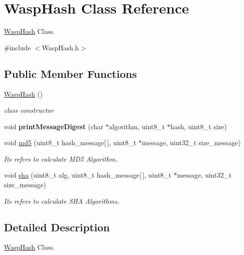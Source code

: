 \hypertarget{class_wasp_hash}{}\section{Wasp\+Hash Class Reference}
\label{class_wasp_hash}


\hyperlink{class_wasp_hash}{Wasp\+Hash} Class.  




{\ttfamily \#include $<$Wasp\+Hash.\+h$>$}

\subsection*{Public Member Functions}
\begin{DoxyCompactItemize}
\item 
\hyperlink{class_wasp_hash_a4f2ee19ac5d0b313e73876903504384c}{Wasp\+Hash} ()
\begin{DoxyCompactList}\small\item\em class constructor \end{DoxyCompactList}\item 
void {\bfseries print\+Message\+Digest} (char $\ast$algorithm, uint8\+\_\+t $\ast$hash, uint8\+\_\+t size)\hypertarget{class_wasp_hash_abd34104e56d2f7229cdef9a9fcc0a76e}{}\label{class_wasp_hash_abd34104e56d2f7229cdef9a9fcc0a76e}

\item 
void \hyperlink{class_wasp_hash_adbaf3ecc4ac812f13ea30d07a4ee554d}{md5} (uint8\+\_\+t hash\+\_\+message\mbox{[}$\,$\mbox{]}, uint8\+\_\+t $\ast$message, uint32\+\_\+t size\+\_\+message)
\begin{DoxyCompactList}\small\item\em Its refers to calculate M\+D5 Algorithm. \end{DoxyCompactList}\item 
void \hyperlink{class_wasp_hash_a3040b506d6db05bde906d77518e97e2b}{sha} (uint8\+\_\+t alg, uint8\+\_\+t hash\+\_\+message\mbox{[}$\,$\mbox{]}, uint8\+\_\+t $\ast$message, uint32\+\_\+t size\+\_\+message)
\begin{DoxyCompactList}\small\item\em Its refers to calculate S\+HA Algorithms. \end{DoxyCompactList}\end{DoxyCompactItemize}


\subsection{Detailed Description}
\hyperlink{class_wasp_hash}{Wasp\+Hash} Class. 

